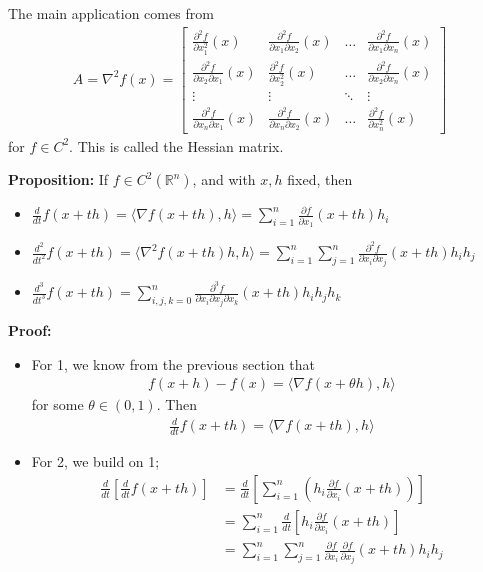 \documentclass{article}
\newcommand*{\iprod}[1]{\langle #1 \rangle}
\newcommand*{\rr}{\mathbb{R}}%
\begin{document}
The main application comes from \begin{align*}
    A=\nabla^2f(x)=\begin{bmatrix}
        \frac{\partial^2 f}{\partial x_1^2}(x) & \frac{\partial^2 f}{\partial x_1\partial x_2}(x) & \dots & \frac{\partial^2 f}{\partial x_1\partial x_n}(x)\\
        \frac{\partial^2 f}{\partial x_2\partial x_1}(x) & \frac{\partial^2 f}{\partial x_2^2}(x) & \dots & \frac{\partial^2 f}{\partial x_2\partial x_n}(x)\\
        \vdots & \vdots & \ddots & \vdots\\
        \frac{\partial^2 f}{\partial x_n\partial x_1}(x) & \frac{\partial^2 f}{\partial x_n\partial x_2}(x) & \dots & \frac{\partial^2 f}{\partial x_n^2}(x)
    \end{bmatrix}
\end{align*} for $f\in C^2$.  This is called the Hessian matrix.

\textbf{Proposition:} If $f\in C^2(\rr^n)$, and with $x,h$ fixed, then \begin{itemize}
    \item $\frac{d}{dt}f(x+th)=\iprod{\nabla f(x+th),h}=\sum_{i=1}^{n}\frac{\partial f}{\partial x_1}(x+th)h_i$
    \item $\frac{d^2}{dt^2}f(x+th)=\iprod{\nabla^2 f(x+th)h,h}=\sum_{i=1}^{n}\sum_{j=1}^{n}\frac{\partial^2 f}{\partial x_i\partial x_j}(x+th)h_ih_j$
    \item $\frac{d^3}{dt^3}f(x+th)=\sum_{i,j,k=0}^{n}\frac{\partial^3 f}{\partial x_i\partial x_j\partial x_k}(x+th)h_ih_jh_k$
\end{itemize}

\textbf{Proof:}\begin{itemize}
    \item For 1, we know from the previous section that \begin{align*}
        f(x+h)-f(x)=\iprod{\nabla f(x+\theta h),h}
    \end{align*} for some $\theta\in (0,1)$. Then \begin{align*}
        \frac{d}{dt}f(x+th)=\iprod{\nabla f(x+th),h}
    \end{align*}
    \item For 2, we build on 1; \begin{align*}
        \frac{d}{dt}[\frac{d}{dt}f(x+th)]&=\frac{d}{dt}[\sum_{i=1}^{n}(h_i\frac{\partial f}{\partial x_i}(x+th))]\\
        &=\sum_{i=1}^{n}\frac{d}{dt}[h_i\frac{\partial f}{\partial x_i}(x+th)]\\
        &=\sum_{i=1}^{n}\sum_{j=1}^{n}\frac{\partial f}{\partial x_i}\frac{\partial f}{\partial x_j}(x+th)h_ih_j
    \end{align*}
\end{itemize}
\end{document}
